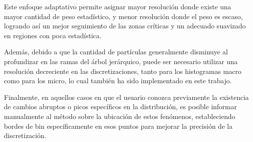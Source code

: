 Este enfoque adaptativo permite asignar mayor resolución donde existe una mayor cantidad de peso estadístico, y menor resolución donde el peso es escaso, logrando así un mejor seguimiento de las zonas críticas y un adecuado suavizado en regiones con poca estadística.

Además, debido a que la cantidad de partículas generalmente disminuye al profundizar en las ramas del árbol jerárquico, puede ser necesario utilizar una resolución decreciente en las discretizaciones, tanto para los histogramas macro como para los micro, lo cual también ha sido implementado en este trabajo.

Finalmente, en aquellos casos en que el usuario conozca previamente la existencia de cambios abruptos o picos específicos en la distribución, es posible informar manualmente al método sobre la ubicación de estos fenómenos, estableciendo bordes de bin específicamente en esos puntos para mejorar la precisión de la discretización.







